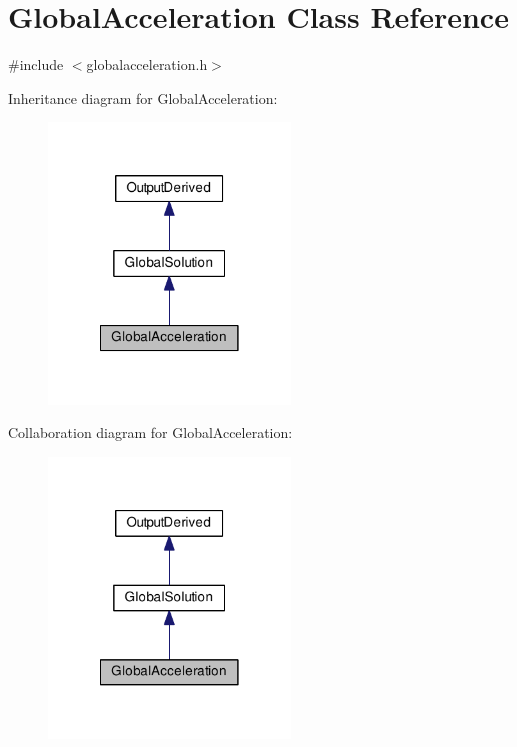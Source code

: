 \hypertarget{class_global_acceleration}{\section{Global\-Acceleration Class Reference}
\label{class_global_acceleration}
}


{\ttfamily \#include $<$globalacceleration.\-h$>$}



Inheritance diagram for Global\-Acceleration\-:\nopagebreak
\begin{figure}[H]
\begin{center}
\leavevmode
\includegraphics[width=182pt]{class_global_acceleration__inherit__graph}
\end{center}
\end{figure}


Collaboration diagram for Global\-Acceleration\-:\nopagebreak
\begin{figure}[H]
\begin{center}
\leavevmode
\includegraphics[width=182pt]{class_global_acceleration__coll__graph}
\end{center}
\end{figure}
